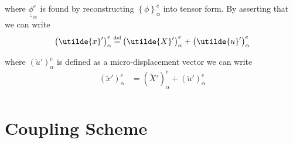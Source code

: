 \documentclass{asme2ej}
\newcommand{\TEN}[1]{\underline{\underline{#1}}}
\newcommand{\VEC}[1]{\utilde{#1}}
\newcommand\defeq{\mathrel{\stackrel{\makebox[0pt]{\mbox{\normalfont\tiny def}}}{=}}}
\newcommand{\micro}[1]{{#1}'}
\begin{document}
where $\TEN{\phi}_{\alpha}^e$ is found by reconstructing $\left\{\phi\right\}_{\alpha}^e$ into tensor form. By asserting that we can write
\begin{align*}
\left(\micro{\VEC{x}}\right)_{\alpha}^e &\defeq \left(\micro{\VEC{X}}\right)_{\alpha}^e + \left(\micro{\VEC{u}}\right)_{\alpha}^e\\
\end{align*}

where $\left(\micro{\VEC{u}}\right)_{\alpha}^e$ is defined as a micro-displacement vector we can write
\begin{align*}
\left(\micro{\VEC{x}}\right)_{\alpha}^e &= \left(\micro{\VEC{X}}\right)_{\alpha}^e + \left(\micro{\VEC{u}}\right)_{\alpha}^e\\
\end{align*}

\section{Coupling Scheme}

\FloatBarrier



\end{document}

